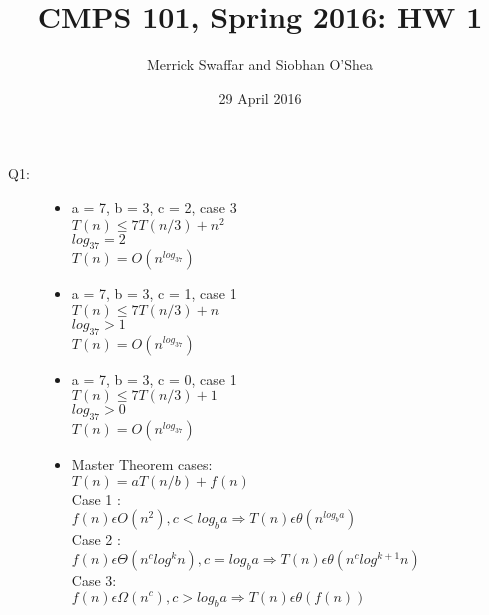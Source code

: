 \documentclass{article}
\title{CMPS 101, Spring 2016: HW 1}
\author{Merrick Swaffar and Siobhan O'Shea}
\date{29 April 2016}
\begin{document}
\maketitle

\begin{description}
\item[Q1:]
    \begin{itemize}
        \item a = 7, b = 3, c = 2, case 3 \\
         $T(n) \leq 7 T(n/3) + n^{2}$ \\
         $log_37 = 2$\\
         $T(n) = O(n^{log_37})$
        \vspace{5mm}    
        
        \item a = 7, b = 3, c = 1, case 1 \\
         $T(n) \leq 7 T(n/3) + n$ \\
         $log_37 > 1$\\
         $T(n) = O(n^{log_37})$
        \vspace{5mm}
        
        \item a = 7, b = 3, c = 0, case 1 \\
         $T(n) \leq 7 T(n/3) + 1$ \\
         $log_37 > 0$\\
         $T(n) = O(n^{log_37})$
        \vspace{5mm}
        
        \item Master Theorem cases: \\
        $T(n) = aT(n/b) + f(n)$\\
        
        Case 1 : \\
        $ f(n) \epsilon O(n^2), c<log_ba \Rightarrow  
        T(n) \epsilon \theta (n^{log_ba})$\\
       
        Case 2 : \\
        $ f(n) \epsilon \Theta (n^{c}log^{k}n), c = log_ba \Rightarrow 
        T(n) \epsilon \theta (n^{c}log^{k+1}n)$\\
      
        Case 3: \\
        $f(n) \epsilon \Omega (n^{c}), c > log_ba
        \Rightarrow 
        T(n) \epsilon \theta (f(n)) $      
    \end{itemize}


\end{description}
\end{document}
